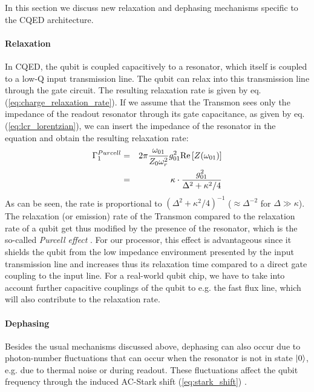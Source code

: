 In this section we discuss new relaxation and dephasing mechanisms specific to the CQED architecture.

\paragraph{Relaxation}

In CQED, the qubit is coupled capacitively to a resonator, which itself is coupled to a low-Q input transmission line. The qubit can relax into this transmission line through the gate circuit. The resulting relaxation rate is given by eq. (\ref{eq:charge_relaxation_rate}). If we assume that the Transmon sees only the impedance of the readout resonator through its gate capacitance, as given by eq. (\ref{eq:lcr_lorentzian}), we can insert the impedance of the resonator in the equation and obtain the resulting relaxation rate:
%
\begin{eqnarray}
\Gamma_1^{Purcell} & = & 2\pi\frac{\omega_{01}}{Z_0 \omega_r^2}g_{01}^2 \mathrm{Re}\left[Z(\omega_{01})\right] \notag \\
                & = & \kappa\cdot\frac{g_{01}^2}{\Delta^2+\kappa^2/4} \label{eq:purcell_rate}
\end{eqnarray}
%
As can be seen, the rate is proportional to $(\Delta^2+\kappa^2/4)^{-1}$ ($\approx\Delta^{-2}$ for $\Delta \gg \kappa$). The relaxation (or emission) rate of the Transmon compared to the relaxation rate of a qubit get thus modified by the presence of the resonator, which is the so-called {\it Purcell effect} \citep{purcell_spontaneous_1946}. For our processor, this effect is advantageous since it shields the qubit from the low impedance environment presented by the input transmission line and increases thus its relaxation time compared to a direct gate coupling to the input line. For a real-world qubit chip, we have to take into account further capacitive couplings of the qubit to e.g. the fast flux line, which will also contribute to the relaxation rate.

\paragraph{Dephasing} Besides the usual mechanisms discussed above, dephasing can also occur due to photon-number fluctuations that can occur when the resonator is not in state $\left| 0 \right>$, e.g. due to thermal noise or during readout. These fluctuations affect the qubit frequency through the induced AC-Stark shift (\ref{eq:stark_shift}) \citep{bertet_dephasing_2005,bertet_dephasing_2005-1,rigetti_superconducting_2012}.

